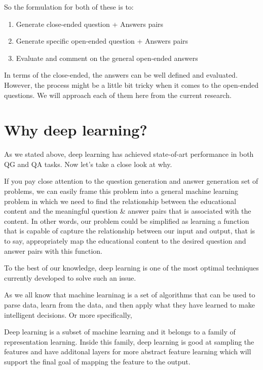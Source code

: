 \documentclass[]{book}
\theoremstyle{definition}
\theoremstyle{definition}
\theoremstyle{definition}
\theoremstyle{remark}
\begin{document}
So the formulation for both of these is to:

\begin{enumerate}
\def\labelenumi{\arabic{enumi}.}
\item
  Generate close-ended question + Answers pairs
\item
  Generate specific open-ended question + Answers pairs
\item
  Evaluate and comment on the general open-ended answers
\end{enumerate}

In terms of the close-ended, the answers can be well defined and
evaluated. However, the process might be a little bit tricky when it
comes to the open-ended questions. We will approach each of them here
from the current research.

\section{Why deep learning?}\label{why-deep-learning}

As we stated above, deep learning has achieved state-of-art performance
in both QG and QA tasks. Now let's take a close look at why.

If you pay close attention to the question generation and answer
generation set of problems, we can easily frame this problem into a
general machine learning problem in which we need to find the
relationship between the educational content and the meaningful question
\& answer pairs that is associated with the content. In other words, our
problem could be simplified as learning a function that is capable of
capture the relationship between our input and output, that is to say,
appropriately map the educational content to the desired question and
answer pairs with this function.

To the best of our knowledge, deep learning is one of the most optimal
techniques currently developed to solve such an issue.

As we all know that machine learninag is a set of algorithms that can be
used to parse data, learn from the data, and then apply what they have
learned to make intelligent decisions. Or more specifically,

Deep learning is a subset of machine learning and it belongs to a family
of representation learning. Inside this family, deep learning is good at
sampling the features and have additonal layers for more abstract
feature learning which will support the final goal of mapping the
feature to the output.
\end{document}
